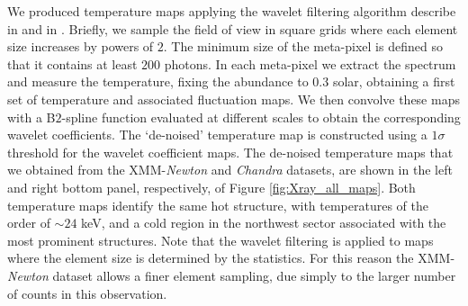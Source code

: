 \documentclass[twocolumn,traditabstract]{aa}
\begin{document}
We produced temperature maps applying the wavelet filtering algorithm describe in \cite{bourdin2004} and in \cite{bourdin2008}. Briefly, we sample the field of view in square grids where each element size increases by powers of $2$. The minimum size of the meta-pixel is defined so that it contains at least $200$ photons. In each meta-pixel we extract the spectrum and measure the temperature, fixing the abundance to $0.3$ solar, obtaining a first set of temperature and associated fluctuation maps. We then convolve these maps with a B$2$-spline function evaluated at different scales to obtain the corresponding wavelet coefficients. The `de-noised' temperature map is constructed using a $1\sigma$ threshold for the wavelet coefficient maps. The de-noised temperature maps that we obtained from the XMM-\textit{Newton} and \textit{Chandra} datasets, are shown in the left and right bottom panel, respectively, of Figure \ref{fig:Xray_all_maps}. Both temperature maps identify the same hot structure, with temperatures of the order of $\sim 24$ keV, and a cold region in the northwest sector associated with the most prominent structures. Note that the wavelet filtering is applied to maps where the element size is determined by the statistics. For this reason the XMM-\textit{Newton} dataset allows a finer element sampling, due simply to the larger number of counts in this observation.
\end{document}
